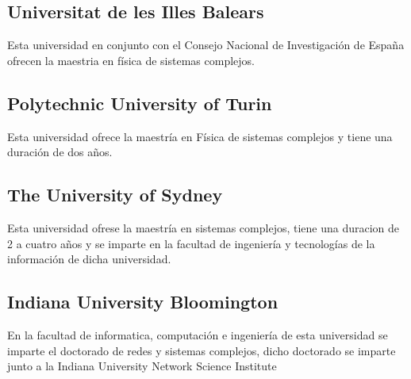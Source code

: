 \documentclass[a4paper,12pt]{article}
\begin{document}
\subsection{Universitat de les Illes Balears}
Esta universidad en conjunto con el Consejo Nacional de Investigación de España ofrecen la maestria en física de sistemas complejos. 
\subsection{Polytechnic University of Turin}
Esta universidad ofrece la maestría en Física de sistemas complejos y tiene una duración de dos años.
\subsection{The University of Sydney}
Esta universidad ofrese la maestría en sistemas complejos, tiene una duracion de 2 a cuatro años y se imparte en la facultad de ingeniería y tecnologías de la información de dicha universidad. 
\subsection{Indiana University Bloomington}
En la facultad de informatica, computación e ingeniería de esta universidad se imparte el doctorado de redes y sistemas complejos, dicho doctorado se imparte junto a la Indiana University Network Science Institute

\nocite{navarra}
\nocite{madrid}
\nocite{uno}
\nocite{dos}
\nocite{tres}
\nocite{cuatro}
\nocite{cinco}
\nocite{seis}



\end{document}
